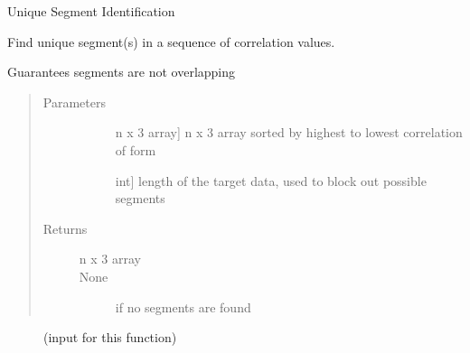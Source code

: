 \documentclass[letterpaper,10pt,english]{sphinxmanual}
\begin{document}
\begin{fulllineitems}
\label{\detokenize{generated/seg1d.algorithm.uniques:seg1d.algorithm.uniques}}
\sphinxAtStartPar
Unique Segment Identification

\begin{DUlineblock}{0em}
\item[] Find unique segment(s) in a sequence of correlation values. 
\item[] Guarantees segments are not overlapping
\end{DUlineblock}
\begin{quote}\begin{description}
\item[{Parameters}] \leavevmode\begin{description}
\item[{}] \leavevmode{[}n x 3 array{]}
\sphinxAtStartPar
n x 3 array sorted by highest to lowest correlation
of form 

\item[{}] \leavevmode{[}int{]}
\sphinxAtStartPar
length of the target data, used to block out possible segments

\end{description}

\item[{Returns}] \leavevmode\begin{description}
\item[{n x 3 array}] \leavevmode
\sphinxAtStartPar
{}

\item[{None}] \leavevmode
\sphinxAtStartPar
if no segments are found

\end{description}

\end{description}\end{quote}


\nopagebreak

\begin{description}
\item[{{\hyperref[\detokenize{generated/seg1d.algorithm.get_peaks:seg1d.algorithm.get_peaks}]{}}}] \leavevmode
\sphinxAtStartPar
(input for this function)


\end{description}
\end{fulllineitems}
\end{document}
